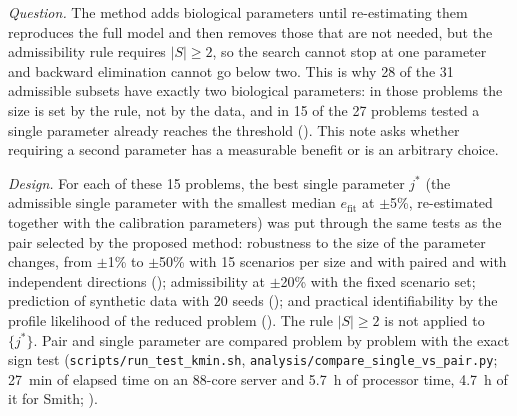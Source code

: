 

\emph{Question.} The method adds biological parameters until re-estimating them reproduces the full model and then removes those that are not needed, but the admissibility rule requires $|S|\ge2$, so the search cannot stop at one parameter and backward elimination cannot go below two. This is why 28 of the 31 admissible subsets have exactly two biological parameters: in those problems the size is set by the rule, not by the data, and in 15 of the 27 problems tested a single parameter already reaches the threshold (). This note asks whether requiring a second parameter has a measurable benefit or is an arbitrary choice.

\emph{Design.} For each of these 15 problems, the best single parameter $j^\ast$ (the admissible single parameter with the smallest median $e_{\mathrm{fit}}$ at $\pm$5\%, re-estimated together with the calibration parameters) was put through the same tests as the pair selected by the proposed method: robustness to the size of the parameter changes, from $\pm$1\% to $\pm$50\% with 15 scenarios per size and with paired and with independent directions (); admissibility at $\pm$20\% with the fixed scenario set; prediction of synthetic data with 20 seeds (); and practical identifiability by the profile likelihood of the reduced problem (). The rule $|S|\ge2$ is not applied to $\{j^\ast\}$. Pair and single parameter are compared problem by problem with the exact sign test (\texttt{scripts/run\_test\_kmin.sh}, \texttt{analysis/compare\_single\_vs\_pair.py}; 27~min of elapsed time on an 88-core server and 5.7~h of processor time, 4.7~h of it for Smith; ).

